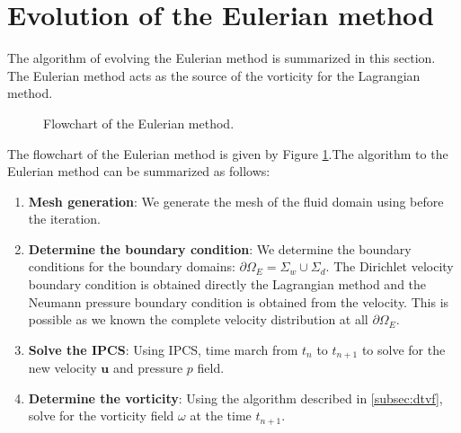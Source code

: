 
\section{Evolution of the Eulerian method}
\label{sec:eu-eotem}
The algorithm of evolving the Eulerian method is summarized in this section. The Eulerian method acts as the source of the vorticity for the Lagrangian method.

	\begin{figure}[!h]
		\centering
		\caption{Flowchart of the Eulerian method.}
		\label{fig:flowchart_eulerian}
	\end{figure}	
	
The flowchart of the Eulerian method is given by Figure \ref{fig:flowchart_eulerian}.The algorithm to the Eulerian method can be summarized as follows:
	\begin{enumerate}
	\item \textbf{Mesh generation}: We generate the mesh of the fluid domain using \gmsh before the iteration.
	\item \textbf{Determine the boundary condition}: We determine the boundary conditions for the boundary domains: $\partial \Omega_E = \Sigma_{w} \cup \Sigma_{d}$. The Dirichlet velocity boundary condition is obtained directly the Lagrangian method and the Neumann pressure boundary condition is obtained from the velocity. This is possible as we known the complete velocity distribution at all $\partial \Omega_E$. 
	
	\item \textbf{Solve the IPCS}: Using IPCS, time march from $t_n$ to $t_{n+1}$ to solve for the new velocity $\mathbf{u}$ and pressure $p$ field.
	\item \textbf{Determine the vorticity}: Using the algorithm described in \ref{subsec:dtvf}, solve for the vorticity field $\omega$ at the time $t_{n+1}$. 
	\end{enumerate}
	
